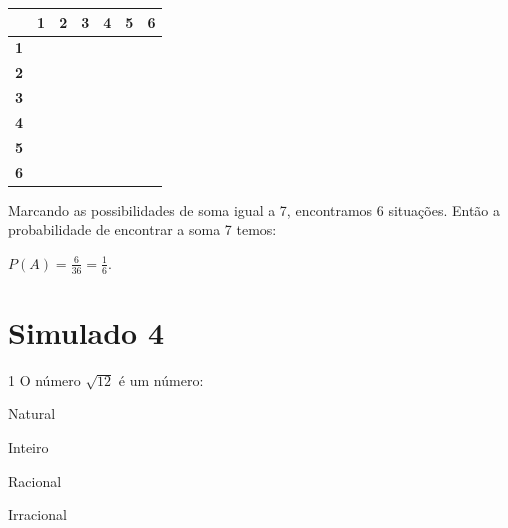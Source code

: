 {{{\begin{escolha}
{{{{{\begin{escolha}
\begin{escolha}
{\begin{q°}
{\begin{escolha}
\begin{escolha}
\begin{escolha}
\begin{escolha}
\begin{escolha}
\begin{escolha}
{{%
\begin{table}[]
\begin{tabular}{|c|c|c|c|c|c|c|}
\hline
\cellcolor[HTML]{000000} & \textbf{1} & \textbf{2} & \textbf{3} & \textbf{4} & \textbf{5} & \textbf{6} \\ \hline
\textbf{1} &  &  &  &  &  & \cellcolor[HTML]{009901} \\ \hline
\textbf{2} &  &  &  &  & \cellcolor[HTML]{009901} &  \\ \hline
\textbf{3} &  &  &  & \cellcolor[HTML]{009901} &  &  \\ \hline
\textbf{4} &  &  & \cellcolor[HTML]{009901} &  &  &  \\ \hline
\textbf{5} &  & \cellcolor[HTML]{009901} &  &  &  &  \\ \hline
\textbf{6} & \cellcolor[HTML]{009901} &  &  &  &  &  \\ \hline
\end{tabular}
\end{table}

Marcando as possibilidades de soma igual a 7, encontramos 6 situações.
Então a probabilidade de encontrar a soma 7 temos:

$P(A) = \frac{6}{36} = \frac{1}{6}$.}

\chapter{Simulado 4}

\num{1} O número $\sqrt{12}$ é um número:

\begin{escolha}

  \item Natural
  
  \item Inteiro
  
  \item Racional
  
  \item Irracional

\end{escolha}

}
\end{escolha}
\end{escolha}
\end{escolha}
\end{escolha}
\end{escolha}
\end{escolha}}
\end{q°}}
\end{escolha}
\end{escolha}}}}}}
\end{escolha}}}}
